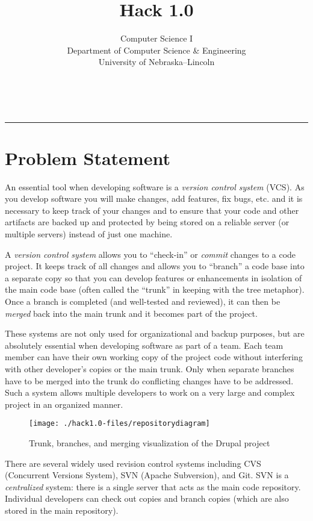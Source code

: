 \documentclass[12pt]{scrartcl}
\title{Hack 1.0}\let\Title\@title
\subtitle{Computer Science I\\
{\small
\vskip1cm
Department of Computer Science \& Engineering \\
University of Nebraska--Lincoln}
\vskip-1cm}
\date{~}
\begin{document}
\maketitle

\hrule



\section*{Problem Statement}

An essential tool when developing software is a \emph{version control system}
(VCS).  As you develop software you will make changes, add features, fix bugs, etc.
and it is necessary to keep track of your changes and to ensure that your 
code and other artifacts are backed up and protected by being stored on a 
reliable server (or multiple servers) instead of just one machine.  

A \emph{version control system} allows you to ``check-in'' or 
\emph{commit} changes to a code project.  It keeps track of all changes 
and allows you to ``branch'' a code base into a separate copy so that 
you can develop features or enhancements in isolation of the
main code base (often called the ``trunk'' in keeping with the tree 
metaphor).  Once a branch is completed (and well-tested and 
reviewed), it can then be \emph{merged} back into the main trunk 
and it becomes part of the project.

These systems are not only used for organizational and backup 
purposes, but are absolutely essential when developing software 
as part of a team.  Each team member can have their own working 
copy of the project code without interfering with other developer's 
copies or the main trunk.  Only when separate branches have to 
be merged into the trunk do conflicting changes have to be addressed.  
Such a system allows multiple developers to work on a 
very large and complex project in an organized manner.

\begin{figure}[h]
\centering
\texttt{[image: ./hack1.0-files/repositorydiagram]}
\caption{Trunk, branches, and merging visualization of the Drupal project}
\end{figure}

There are several widely used revision control systems including 
CVS (Concurrent Versions System), SVN (Apache Subversion), and 
Git.  SVN is a \emph{centralized} system: there is a single server that 
acts as the main code repository.  Individual developers can check out 
copies and branch copies (which are also stored in the main repository).  
\end{document}
